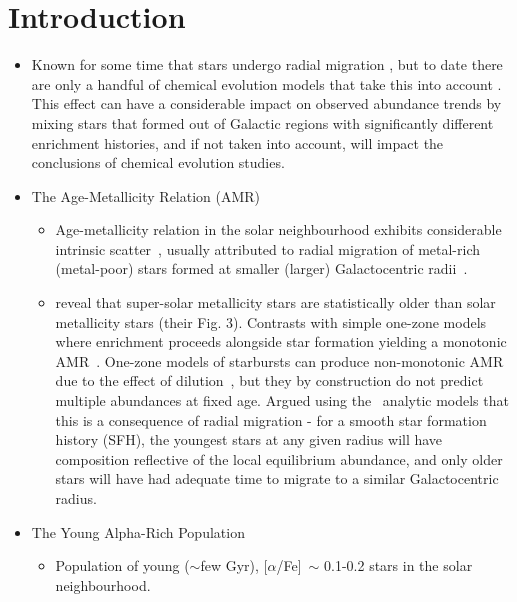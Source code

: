 \documentclass[fleqn, usenatbib]{mnras}
\begin{document}
\section{Introduction} 
\label{sec:intro} 
\begin{itemize} 
	\item Known for some time that stars undergo radial migration 
	\citep[e.g.][]{Wielen1996}, but to date there are only a handful of 
	chemical evolution models that take this into account 
	\citep[e.g.][]{Schoenrich2009, Minchev2013, Sharma2020}. This effect can 
	have a considerable impact on observed abundance trends by mixing stars 
	that formed out of Galactic regions with significantly different 
	enrichment histories, and if not taken into account, will impact the 
	conclusions of chemical evolution studies. 

	\item The Age-Metallicity Relation (AMR) 
	\begin{itemize} 
		\item Age-metallicity relation in the solar neighbourhood exhibits 
		considerable intrinsic scatter~\citep{Edvardsson1993}, usually 
		attributed to radial migration of metal-rich (metal-poor) stars formed 
		at smaller (larger) Galactocentric radii~\citep{Sellwood2002, 
		Haywood2008, Roskar2008b, Schoenrich2009}. 

		\item \citet{Feuillet2018} reveal that super-solar metallicity stars 
		are statistically older than solar metallicity stars (their Fig. 3). 
		Contrasts with simple one-zone models where enrichment proceeds 
		alongside star formation yielding a monotonic 
		AMR~\citep[e.g.][]{Andrews2017, Weinberg2017}. One-zone models of 
		starbursts can produce non-monotonic AMR due to the effect of 
		dilution~\citep{Johnson2020}, but they by construction do not predict 
		multiple abundances at fixed age. Argued using 
		the~\citet{Weinberg2017} 
		analytic models that this is a consequence of radial migration - for a 
		smooth star formation history (SFH), the youngest stars at any given 
		radius will have composition reflective of the local equilibrium 
		abundance, and only older stars will have had adequate time to 
		migrate to a similar Galactocentric radius. 
	\end{itemize}

	\item The Young Alpha-Rich Population 
	\begin{itemize} 
		\item Population of young ($\sim$few Gyr), [$\alpha$/Fe]~$\sim$ 
		0.1-0.2 stars in the solar neighbourhood. 


\end{itemize}
\end{itemize}
\end{document}

